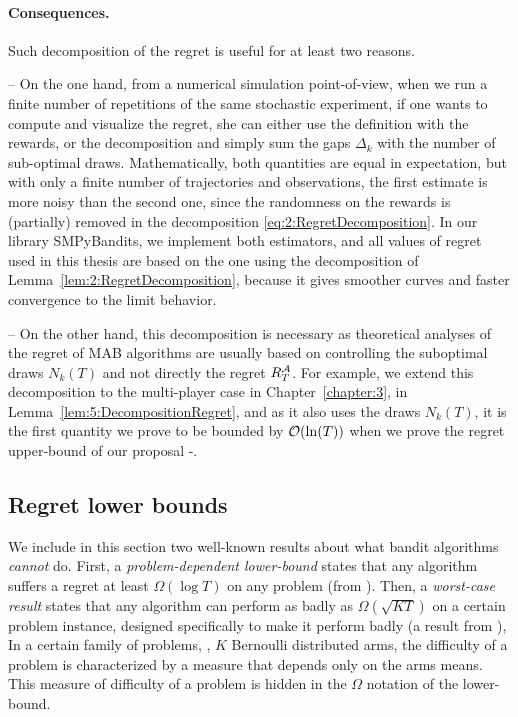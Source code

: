 \paragraph{Consequences.}
%
Such decomposition of the regret is useful for at least two reasons.

-- On the one hand, from a numerical simulation point-of-view, when we run a finite number of repetitions of the same stochastic experiment, if one wants to compute and visualize the regret, she can either use the definition with the rewards, or the decomposition and simply sum the gaps $\Delta_k$ with the number of sub-optimal draws.
Mathematically, both quantities are equal in expectation, but with only a finite number of trajectories and observations, the first estimate is more noisy than the second one, since the randomness on the rewards is (partially) removed in the decomposition \eqref{eq:2:RegretDecomposition}.
In our library SMPyBandits, we implement both estimators, and all values of regret used in this thesis are based on the one using the decomposition of Lemma~\ref{lem:2:RegretDecomposition}, because it gives smoother curves and faster convergence to the limit behavior.

-- On the other hand, this decomposition is necessary as theoretical analyses of the regret of MAB algorithms are usually based on controlling the suboptimal draws $N_k(T)$ and not directly the regret $R_T^{\mathcal{A}}$.
For example, we extend this decomposition to the multi-player case in Chapter~\ref{chapter:3}, in Lemma~\ref{lem:5:DecompositionRegret}, and as it also uses the draws $N_k(T)$, it is the first quantity we prove to be bounded by $\mathop{}\mathopen{}\mathcal{O}\mathopen{}\left(\ln(T)\right)$ when we prove the regret upper-bound of our proposal \MCTopM-\klUCB.


\subsection{Regret lower bounds}

We include in this section two well-known results about what bandit algorithms \emph{cannot} do.
First, a \emph{problem-dependent lower-bound} states that any algorithm suffers a regret at least $\Omega(\log T)$ on any problem (from \cite{LaiRobbins85}).
Then, a \emph{worst-case result} states that any algorithm can perform as badly as $\Omega(\sqrt{K T})$ on a certain problem instance, designed specifically to make it perform badly (a result from \cite{Auer02NonStochastic}),
%
In a certain family of problems, \eg, $K$ Bernoulli distributed arms, the difficulty of a problem is characterized by a measure that depends only on the arms means. This measure of difficulty of a problem is hidden in the $\Omega$ notation of the lower-bound.

